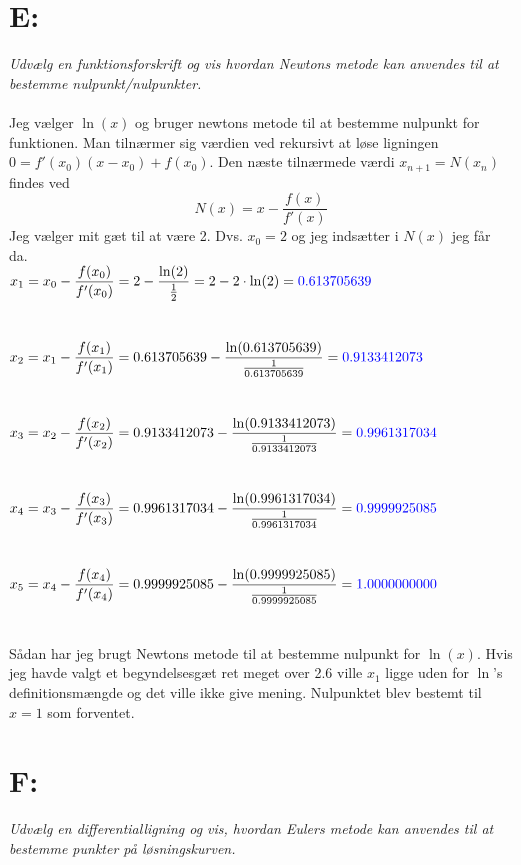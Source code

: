 \documentclass[a4paper, 11pt]{article}
\begin{document}
\section*{E:}
\textit{Udvælg en funktionsforskrift og vis hvordan Newtons metode kan anvendes til at bestemme nulpunkt/nulpunkter.}\\\\
Jeg vælger \(\ln(x)\) og bruger newtons metode til at bestemme nulpunkt for funktionen.
Man tilnærmer sig værdien ved rekursivt at løse ligningen \(0=f'(x_0)(x-x_0)+f(x_0)\). Den næste tilnærmede værdi \(x_{n+1}=N(x_n)\) findes ved
\[N(x)=x-\frac{f(x)}{f'(x)}\]
Jeg vælger mit gæt til at være 2. Dvs. \(x_0=2\) og jeg indsætter i \(N(x)\) jeg får da.\\
\(\displaystyle x_1=x_0-\frac{f(x_0)}{f'(x_0)} = 2- \frac{\ln(2)}{\frac{1}{2}}=2-2\cdot \ln(2)= \textcolor{blue}{0.613705639}\)\\\\\\
\(\displaystyle x_2=x_1-\frac{f(x_1)}{f'(x_1)} = 0.613705639- \frac{\ln(0.613705639)}{\frac{1}{0.613705639}}= \textcolor{blue}{0.9133412073}\)\\\\\\
\(\displaystyle x_3=x_2-\frac{f(x_2)}{f'(x_2)} = 0.9133412073- \frac{\ln(0.9133412073)}{\frac{1}{0.9133412073}}= \textcolor{blue}{0.9961317034}\)\\\\\\
\(\displaystyle x_4=x_3-\frac{f(x_3)}{f'(x_3)} = 0.9961317034- \frac{\ln(0.9961317034)}{\frac{1}{0.9961317034}}= \textcolor{blue}{0.9999925085}\)\\\\\\
\(\displaystyle x_5=x_4-\frac{f(x_4)}{f'(x_4)} = 0.9999925085- \frac{\ln(0.9999925085)}{\frac{1}{0.9999925085}}= \textcolor{blue}{1.0000000000}\)\\\\\\
Sådan har jeg brugt Newtons metode til at bestemme nulpunkt for \(\ln(x)\). Hvis jeg havde valgt et begyndelsesgæt ret meget over 2.6 ville \(x_1\) ligge uden for \(\ln\)'s definitionsmængde og det ville ikke give mening. Nulpunktet blev bestemt til \(x=1\) som forventet.
\clearpage
\section*{F:}
\textit{Udvælg en differentialligning og vis, hvordan Eulers metode kan anvendes til at bestemme punkter på løsningskurven.}\\\\
\end{document}
